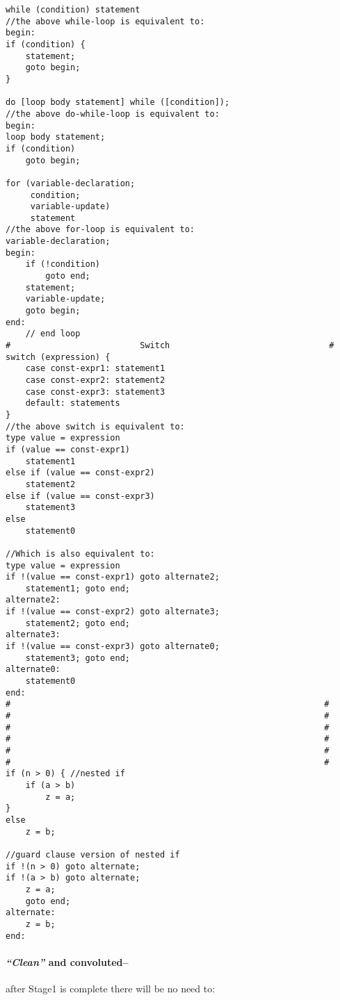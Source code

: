 \begin{verbatim}
while (condition) statement
//the above while-loop is equivalent to:
begin:
if (condition) {
    statement;
    goto begin;
}

do [loop body statement] while ([condition]);
//the above do-while-loop is equivalent to:
begin:
loop body statement;
if (condition)
    goto begin;

for (variable-declaration;
     condition;
     variable-update)
     statement
//the above for-loop is equivalent to:
variable-declaration;
begin:
    if (!condition)
        goto end;
    statement;
    variable-update;
    goto begin;
end:
    // end loop 
#                          Switch                                #
switch (expression) {
    case const-expr1: statement1
    case const-expr2: statement2
    case const-expr3: statement3
    default: statements
}
//the above switch is equivalent to:
type value = expression
if (value == const-expr1)
    statement1
else if (value == const-expr2)
    statement2
else if (value == const-expr3)
    statement3
else
    statement0

//Which is also equivalent to:
type value = expression
if !(value == const-expr1) goto alternate2;
    statement1; goto end;
alternate2:
if !(value == const-expr2) goto alternate3;
    statement2; goto end;
alternate3:
if !(value == const-expr3) goto alternate0;
    statement3; goto end;
alternate0:
    statement0
end:
#                                                               #
#                                                               #
#                                                               #
#                                                               #
#                                                               #
#                                                               #
if (n > 0) { //nested if
    if (a > b)
        z = a;
}
else
    z = b;

//guard clause version of nested if
if !(n > 0) goto alternate;
if !(a > b) goto alternate;
    z = a;
    goto end;
alternate:
    z = b;
end:
\end{verbatim}

\hypertarget{clean-and-convoluted}{%
\paragraph{\texorpdfstring{\emph{``Clean''} and
convoluted--}{``Clean'' and convoluted--}}\label{clean-and-convoluted}}

after Stage1 is complete there will be no need to:

